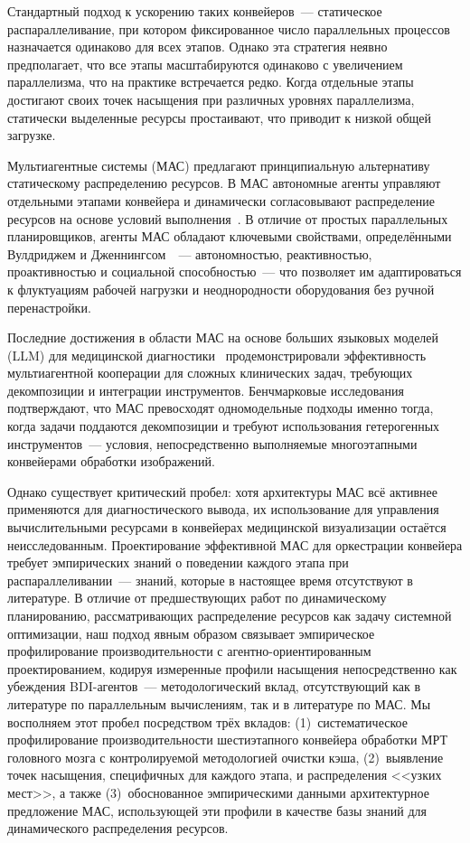 \documentclass[conference]{IEEEtran}
\begin{document}
Стандартный подход к ускорению таких конвейеров~--- статическое распараллеливание, при котором фиксированное число параллельных процессов назначается одинаково для всех этапов. Однако эта стратегия неявно предполагает, что все этапы масштабируются одинаково с увеличением параллелизма, что на практике встречается редко. Когда отдельные этапы достигают своих точек насыщения при различных уровнях параллелизма, статически выделенные ресурсы простаивают, что приводит к низкой общей загрузке.

Мультиагентные системы (МАС) предлагают принципиальную альтернативу статическому распределению ресурсов. В МАС автономные агенты управляют отдельными этапами конвейера и динамически согласовывают распределение ресурсов на основе условий выполнения~\cite{wooldridge2009}. В отличие от простых параллельных планировщиков, агенты МАС обладают ключевыми свойствами, определёнными Вулдриджем и Дженнингсом~\cite{wooldridge1995}~--- автономностью, реактивностью, проактивностью и социальной способностью~--- что позволяет им адаптироваться к флуктуациям рабочей нагрузки и неоднородности оборудования без ручной перенастройки.

Последние достижения в области МАС на основе больших языковых моделей (LLM) для медицинской диагностики~\cite{tang2024,kim2024} продемонстрировали эффективность мультиагентной кооперации для сложных клинических задач, требующих декомпозиции и интеграции инструментов. Бенчмарковые исследования~\cite{zhu2025} подтверждают, что МАС превосходят одномодельные подходы именно тогда, когда задачи поддаются декомпозиции и требуют использования гетерогенных инструментов~--- условия, непосредственно выполняемые многоэтапными конвейерами обработки изображений.

Однако существует критический пробел: хотя архитектуры МАС всё активнее применяются для диагностического вывода, их использование для управления вычислительными ресурсами в конвейерах медицинской визуализации остаётся неисследованным. Проектирование эффективной МАС для оркестрации конвейера требует эмпирических знаний о поведении каждого этапа при распараллеливании~--- знаний, которые в настоящее время отсутствуют в литературе. В отличие от предшествующих работ по динамическому планированию, рассматривающих распределение ресурсов как задачу системной оптимизации, наш подход явным образом связывает эмпирическое профилирование производительности с агентно-ориентированным проектированием, кодируя измеренные профили насыщения непосредственно как убеждения BDI-агентов~--- методологический вклад, отсутствующий как в литературе по параллельным вычислениям, так и в литературе по МАС. Мы восполняем этот пробел посредством трёх вкладов: (1)~систематическое профилирование производительности шестиэтапного конвейера обработки МРТ головного мозга с контролируемой методологией очистки кэша, (2)~выявление точек насыщения, специфичных для каждого этапа, и распределения <<узких мест>>, а также (3)~обоснованное эмпирическими данными архитектурное предложение МАС, использующей эти профили в качестве базы знаний для динамического распределения ресурсов.
\end{document}
